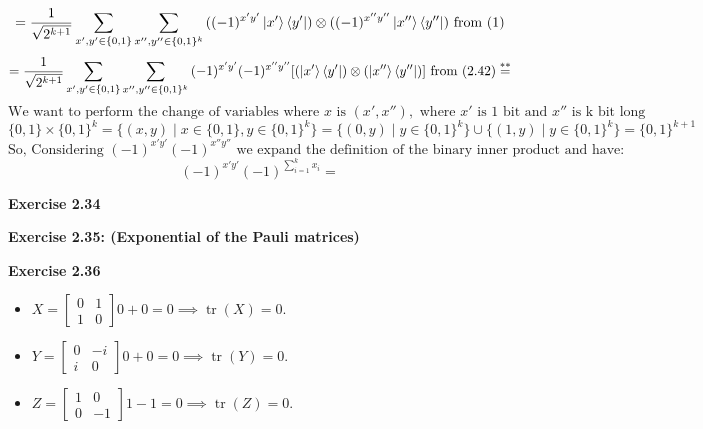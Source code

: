 \documentclass{article}
\begin{document}
\begin{framed}
\begin{equation}
        \tag{1}
    \end{equation}
    $$
    = \frac{1}{\sqrt{2^{k+1}}}\sum_{x',y'\in\{0,1\}}\sum_{x'',y''\in\{0,1\}^k}{((-1)^{x'y'}\ket{x'}\bra{y'}) \otimes ((-1)^{x''y''}\ket{x''}\bra{y''})}
     \text{ from (1)}
    $$
    $$
    = \frac{1}{\sqrt{2^{k+1}}}\sum_{x',y'\in\{0,1\}}\sum_{x'',y''\in\{0,1\}^k}{(-1)^{x'y'}(-1)^{x''y''}[(\ket{x'}\bra{y'}) \otimes (\ket{x''}\bra{y''})]}
     \text{ from (2.42)} \overset{**}{=}
    $$
    $$
    \text{We want to perform the change of variables where } x \text{ is } (x', x''), \text{ where } x' \text{ is 1 bit and } x'' \text{ is k bit long}   
    $$
    $$
    \{0,1\} \times \{0,1\}^k = \{(x, y) \mid x \in \{0,1\}, y \in \{0,1\}^k\} = \{(0, y) \mid y \in \{0,1\}^k\} \cup \{(1, y) \mid y \in \{0,1\}^k\} = \{0,1\}^{k+1}
    $$
    $$
    \text{So, Considering } (-1)^{x'y'}(-1)^{x''y''} \text { we expand the definition of the binary inner product and have: } 
    $$
    $$
    (-1)^{x'y'}(-1)^{\sum_{i = 1}^{k}{x_i}} = 
    $$


\end{framed}

\bigskip

\begin{framed}
    \noindent \textbf{Exercise 2.34}
    
    \medskip
    
    
\end{framed}

\bigskip

\begin{framed}
    \noindent \textbf{Exercise 2.35: (Exponential of the Pauli matrices)}
    
    \medskip
    
    
\end{framed}

\bigskip

\begin{framed}
    \noindent \textbf{Exercise 2.36}
    
    \medskip
    
    \begin{itemize}
        \item $X = \begin{bmatrix} 0 & 1 \\ 1 & 0\end{bmatrix} 0 + 0 = 0 \implies \operatorname{tr}(X) = 0  $.
        \item $Y = \begin{bmatrix} 0 & -i \\ i & 0\end{bmatrix} 0 + 0 = 0 \implies \operatorname{tr}(Y) = 0  $.
        \item $Z = \begin{bmatrix} 1 & 0 \\0 & -1\end{bmatrix} 1 - 1 = 0 \implies \operatorname{tr}(Z) = 0 $.
    \end{itemize}
    
\end{framed}
\end{document}
